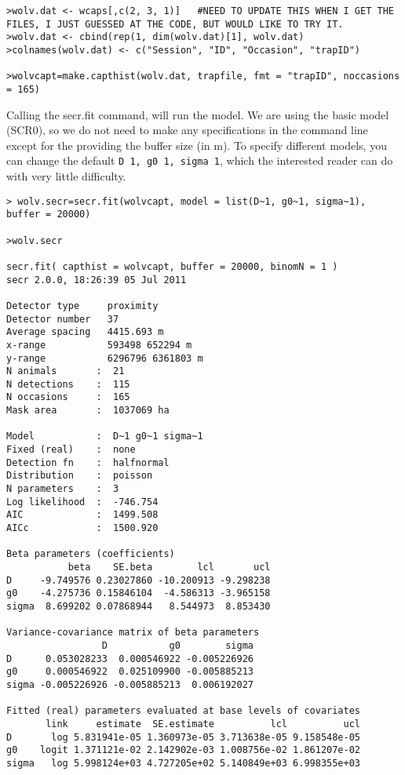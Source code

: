 \begin{verbatim}
>wolv.dat <- wcaps[,c(2, 3, 1)]   #NEED TO UPDATE THIS WHEN I GET THE FILES, I JUST GUESSED AT THE CODE, BUT WOULD LIKE TO TRY IT. 
>wolv.dat <- cbind(rep(1, dim(wolv.dat)[1], wolv.dat)  
>colnames(wolv.dat) <- c("Session", "ID", "Occasion", "trapID")

>wolvcapt=make.capthist(wolv.dat, trapfile, fmt = "trapID", noccasions = 165)
\end{verbatim}

Calling the secr.fit command, will run the model.  We are using the
basic model (SCR0), so we do not need to make any specifications in
the command line except for the providing the buffer size (in m).  To
specify different models, you can change the default
\mbox{\tt D~1, g0~1, sigma~1}, which the interested reader can do with
very little difficulty.


\begin{verbatim}
> wolv.secr=secr.fit(wolvcapt, model = list(D~1, g0~1, sigma~1), buffer = 20000)

>wolv.secr

secr.fit( capthist = wolvcapt, buffer = 20000, binomN = 1 )
secr 2.0.0, 18:26:39 05 Jul 2011

Detector type     proximity 
Detector number   37 
Average spacing   4415.693 m 
x-range           593498 652294 m 
y-range           6296796 6361803 m 
N animals       :  21  
N detections    :  115 
N occasions     :  165 
Mask area       :  1037069 ha 

Model           :  D~1 g0~1 sigma~1 
Fixed (real)    :  none 
Detection fn    :  halfnormal 
Distribution    :  poisson 
N parameters    :  3 
Log likelihood  :  -746.754 
AIC             :  1499.508 
AICc            :  1500.920 

Beta parameters (coefficients) 
           beta    SE.beta        lcl       ucl
D     -9.749576 0.23027860 -10.200913 -9.298238
g0    -4.275736 0.15846104  -4.586313 -3.965158
sigma  8.699202 0.07868944   8.544973  8.853430

Variance-covariance matrix of beta parameters 
                 D           g0        sigma
D      0.053028233  0.000546922 -0.005226926
g0     0.000546922  0.025109900 -0.005885213
sigma -0.005226926 -0.005885213  0.006192027

Fitted (real) parameters evaluated at base levels of covariates 
       link     estimate  SE.estimate          lcl          ucl
D       log 5.831941e-05 1.360973e-05 3.713638e-05 9.158548e-05
g0    logit 1.371121e-02 2.142902e-03 1.008756e-02 1.861207e-02
sigma   log 5.998124e+03 4.727205e+02 5.140849e+03 6.998355e+03
\end{verbatim}

